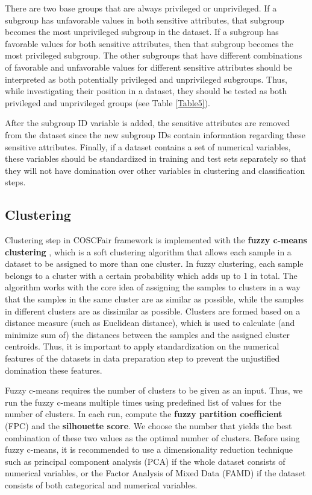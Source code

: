 There are two base groups that are always privileged or unprivileged. If a subgroup has unfavorable values in both sensitive attributes, that subgroup becomes the most unprivileged subgroup in the dataset. If a subgroup has favorable values for both sensitive attributes, then that subgroup becomes the most privileged subgroup. The other subgroups that have different combinations of favorable and unfavorable values for different sensitive attributes should be interpreted as both potentially privileged and unprivileged subgroups. Thus, while investigating their position in a dataset, they should be tested as both privileged and unprivileged groups (see Table \ref{Table5}).

After the subgroup ID variable is added, the sensitive attributes are removed from the dataset since the new subgroup IDs contain information regarding these sensitive attributes. Finally, if a dataset contains a set of numerical variables, these variables should be standardized in training and test sets separately so that they will not have domination over other variables in clustering and classification steps.


\subsection{Clustering}\label{ssec:clust}

Clustering step in COSCFair framework is implemented with the \textbf{fuzzy c-means clustering} \cite{fuzzyc}, which is a soft clustering algorithm that allows each sample in a dataset to be assigned to more than one cluster. In fuzzy clustering, each sample belongs to a cluster with a certain probability which adds up to 1 in total. The algorithm works with the core idea of assigning the samples to clusters in a way that the samples in the same cluster are as similar as possible, while the samples in different clusters are as dissimilar as possible. Clusters are formed based on a distance measure (such as Euclidean distance), which is used to calculate (and minimize sum of) the distances between the samples and the assigned cluster centroids. Thus, it is important to apply standardization on the numerical features of the datasets in data preparation step to prevent the unjustified domination these features.

Fuzzy c-means requires the number of clusters to be given as an input. Thus, we run the fuzzy c-means multiple times using predefined list of values for the number of clusters. In each run, compute the \textbf{fuzzy partition coefficient} (FPC) and the \textbf{silhouette score}. We choose the number that yields the best combination of these two values as the optimal number of clusters. Before using fuzzy c-means, it is recommended to use a dimensionality reduction technique such as principal component analysis (PCA) if the whole dataset consists of numerical variables, or the Factor Analysis of Mixed Data (FAMD) if the dataset consists of both categorical and numerical variables.

